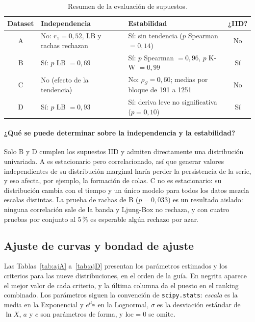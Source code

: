 \documentclass[11pt,a4paper]{article}
\begin{document}
\begin{table}[H]\centering\small
\caption{Resumen de la evaluación de supuestos.}\label{tab:resumen_iid}
\begin{tabular}{cp{}p{}c}\toprule
\textbf{Dataset}&\textbf{Independencia}&\textbf{Estabilidad}&\textbf{¿IID?}\\\midrule
A&No: $r_1=0{,}52$, LB y rachas rechazan&Sí: sin tendencia ($p$ Spearman $=0{,}14$)&No\\
B&Sí: $p$ LB $=0{,}69$&Sí: $p$ Spearman $=0{,}96$, $p$ K-W $=0{,}99$&Sí\\
C&No (efecto de la tendencia)&No: $\rho_S=0{,}60$; medias por bloque de 191 a 1251&No\\
D&Sí: $p$ LB $=0{,}93$&Sí: deriva leve no significativa ($p=0{,}10$)&Sí\\\bottomrule
\end{tabular}\end{table}

\paragraph{¿Qué se puede determinar sobre la independencia y la estabilidad?} Solo B y D cumplen
los supuestos IID y admiten directamente una distribución univariada. A es estacionario pero
correlacionado, así que generar valores independientes de su distribución marginal haría perder
la persistencia de la serie, y eso afecta, por ejemplo, la formación de colas. C no es
estacionario: su distribución cambia con el tiempo y un único modelo para todos los datos mezcla
escalas distintas. La prueba de rachas de B ($p=0{,}033$) es un resultado aislado: ninguna
correlación sale de la banda y Ljung-Box no rechaza, y con cuatro pruebas por conjunto al 5\,\%
es esperable algún rechazo por azar.

\subsection{Ajuste de curvas y bondad de ajuste}
Las Tablas~\ref{tab:ajA} a~\ref{tab:ajD} presentan los parámetros estimados y los criterios para
las nueve distribuciones, en el orden de la guía. En negrita aparece el mejor valor de cada
criterio, y la última columna da el puesto en el ranking combinado. Los parámetros siguen la
convención de \texttt{scipy.stats}: \emph{escala} es la media en la Exponencial y
$e^{\mu_{\ln}}$ en la Lognormal, $\sigma$ es la desviación estándar de $\ln X$, $a$ y $c$ son
parámetros de forma, y $\text{loc}=0$ se omite.
\end{document}
